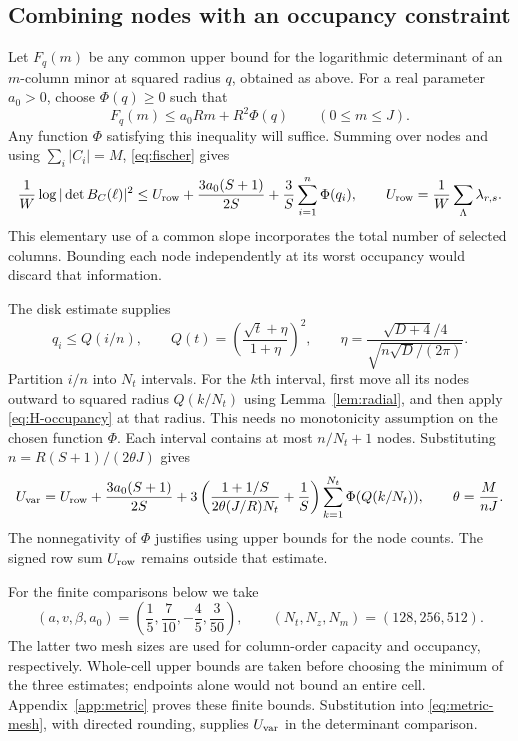 \subsection{Combining nodes with an occupancy constraint}
Let $F_q(m)$ be any common upper bound for the logarithmic determinant of an $m$-column minor at squared radius $q$, obtained as above. For a real parameter $a_0>0$, choose $\Phi(q)\geq0$ such that
\begin{equation}\label{eq:H-occupancy}
 F_q(m)\leq a_0Rm+R^2\Phi(q)\qquad(0\leq m\leq J).
\end{equation}
Any function $\Phi$ satisfying this inequality will suffice. Summing over nodes and using $\sum_i|C_i|=M$, \eqref{eq:fischer} gives
\begin{equation}\label{eq:occupancy-exact}
 \frac1W\log|\det B_C(\ell)|^2
 \leq U_{\rm row}+\frac{3a_0(S+1)}{2S}
                   +\frac3S\sum_{i=1}^n\Phi(q_i),
 \qquad U_{\rm row}=\frac1W\sum_\Lambda\lambda_{r,s}.
\end{equation}
This elementary use of a common slope incorporates the total number of selected columns. Bounding each node independently at its worst occupancy would discard that information.

The disk estimate supplies
\[
 q_i\leq Q(i/n),\qquad
 Q(t)=\left(\frac{\sqrt t+\eta}{1+\eta}\right)^2,\qquad
 \eta=\frac{\sqrt{D+4}/4}{\sqrt{n\sqrt D/(2\pi)}}.
\]
Partition $i/n$ into $N_t$ intervals. For the $k$th interval, first move all
its nodes outward to squared radius $Q(k/N_t)$ using Lemma~\ref{lem:radial},
and then apply \eqref{eq:H-occupancy} at that radius. This needs no monotonicity
assumption on the chosen function $\Phi$. Each interval contains at most
$n/N_t+1$ nodes. Substituting $n=R(S+1)/(2\theta J)$ gives
\begin{equation}\label{eq:metric-mesh}
 U_{\rm var}=U_{\rm row}+\frac{3a_0(S+1)}{2S}
   +3\left(\frac{1+1/S}{2\theta(J/R)N_t}+\frac1S\right)
       \sum_{k=1}^{N_t}\Phi(Q(k/N_t)),
 \qquad \theta=\frac{M}{nJ}.
\end{equation}
The nonnegativity of $\Phi$ justifies using upper bounds for the node counts. The signed row sum $U_{\rm row}$ remains outside that estimate.

For the finite comparisons below we take
\begin{equation}\label{eq:spectral-parameters}
 (a,v,\beta,a_0)=\left(\frac15,\frac7{10},-\frac45,\frac3{50}\right),
 \qquad (N_t,N_z,N_m)=(128,256,512).
\end{equation}
The latter two mesh sizes are used for column-order capacity and occupancy, respectively. Whole-cell upper bounds are taken before choosing the minimum of the three estimates; endpoints alone would not bound an entire cell. Appendix~\ref{app:metric} proves these finite bounds. Substitution into \eqref{eq:metric-mesh}, with directed rounding, supplies $U_{\rm var}$ in the determinant comparison.
